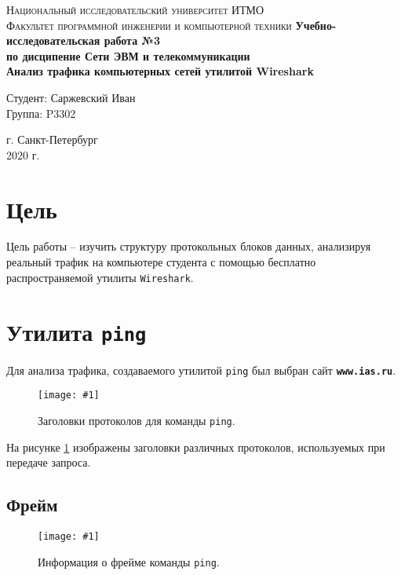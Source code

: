 \documentclass[12pt, a4paper]{article}
\newcommand{\fig}[4]{
  \begin{figure}[h]
    \texttt{[image: \#1]}
    \caption{#2}
    \label{fig:#3}
  \end{figure}
}
\newcommand{\figc}[4]{
  \begin{center}
    \fig{#1}{#2}{#3}{#4}
  \end{center}
}
\begin{document}
\begin{titlepage}
\begin{center}

\textsc{Национальный исследовательский университет ИТМО\\[4mm]
Факультет программной инженерии и компьютерной техники}
\vfill
\textbf{Учебно-исследовательская работа №3\\[4mm]
по дисципение Сети ЭВМ и телекоммуникации\\[4mm]
Анализ трафика компьютерных сетей утилитой Wireshark\\[16mm]
}
\begin{flushright}
Студент: Саржевский Иван
\\[2mm]Группа: P3302
\end{flushright}
\vfill
г. Санкт-Петербург\\[2mm]
2020 г.

\end{center}
\end{titlepage}

\tableofcontents
\newpage

\justify

\section{Цель}

Цель работы – изучить структуру протокольных блоков данных, анализируя реальный
трафик на компьютере студента с помощью бесплатно распространяемой утилиты
\texttt{Wireshark}.

\section{Утилита \texttt{ping}}

Для анализа трафика, создаваемого утилитой \texttt{ping} был выбран сайт
\textbf{\texttt{www.ias.ru}}.

\figc{ping_headers}{Заголовки протоколов для команды \texttt{ping}.}{p_h}{3.0}

На рисунке \ref{fig:p_h} изображены заголовки различных протоколов, используемых
при передаче запроса.

\subsection{Фрейм}

\figc{ping_frame}{Информация о фрейме команды \texttt{ping}.}{p_f}{3.0}
\end{document}
